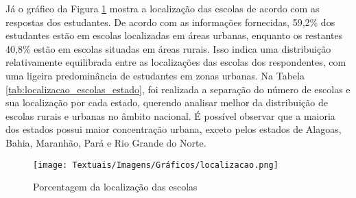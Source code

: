 

Já o gráfico da Figura \ref{fig:localizacao} mostra a localização das escolas de acordo com as respostas dos estudantes. De acordo com as informações fornecidas, 59,2\% dos estudantes estão em escolas localizadas em áreas urbanas, enquanto os restantes 40,8\% estão em escolas situadas em áreas rurais. Isso indica uma distribuição relativamente equilibrada entre as localizações das escolas dos respondentes, com uma ligeira predominância de estudantes em zonas urbanas. Na Tabela \ref{tab:localizacao_escolas_estado}, foi realizada a separação do número de escolas e sua localização por cada estado, querendo analisar melhor da distribuição de escolas rurais e urbanas no âmbito nacional. É possível observar que a maioria dos estados possui maior concentração urbana, exceto pelos estados de Alagoas, Bahia, Maranhão, Pará e Rio Grande do Norte.

\begin{figure}[ht!]
    \centering
    
    \caption{Porcentagem da localização das escolas}
    \texttt{[image: Textuais/Imagens/Gráficos/localizacao.png]}
    \label{fig:localizacao}
\end{figure}

\begin{table}[ht!]
\centering
\caption{Localização das escolas dividida por estado}
\label{tab:localizacao_escolas_estado}
\end{table}

